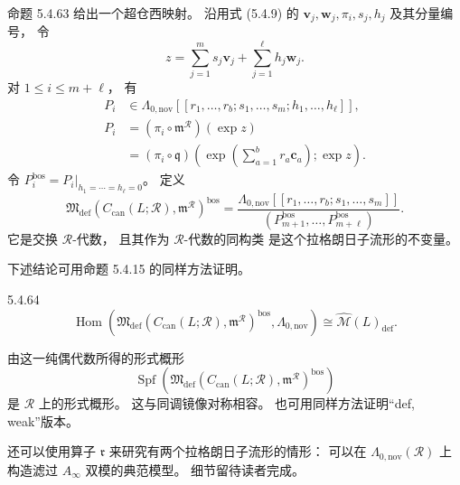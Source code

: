 命题 5.4.63 给出一个超仓西映射。
沿用式 (5.4.9) 的
$\mathbf v_j,\mathbf w_j,\pi_i,s_j,h_j$
及其分量编号，
令
\[
z=\sum_{j=1}^{m}s_j\mathbf v_j
+\sum_{j=1}^{\ell}h_j\mathbf w_j.
\]
对 $1\le i\le m+\ell$，
有
\[
\begin{aligned}
P_i&\in
\Lambda_{0,\mathrm{nov}}
[[r_1,\ldots,r_b;
s_1,\ldots,s_m;
h_1,\ldots,h_\ell]],\\
P_i
&=(\pi_i\circ\mathfrak m^{\mathcal R})(\exp z)\\
&=(\pi_i\circ\mathfrak q)
\left(
\exp\left(\sum_{a=1}^{b}r_a\mathbf c_a\right);
\exp z
\right).
\end{aligned}
\]
令
$P_i^{\mathrm{bos}}=
P_i|_{h_1=\cdots=h_\ell=0}$。
定义
\[
\mathfrak M_{\mathrm{def}}
(C_{\mathrm{can}}(L;\mathcal R),
\mathfrak m^{\mathcal R})^{\mathrm{bos}}
=
\frac{
\Lambda_{0,\mathrm{nov}}
[[r_1,\ldots,r_b;s_1,\ldots,s_m]]
}{
(P_{m+1}^{\mathrm{bos}},
\ldots,P_{m+\ell}^{\mathrm{bos}})
}.
\]
它是交换 $\mathcal R$-代数，
且其作为 $\mathcal R$-代数的同构类
是这个拉格朗日子流形的不变量。

下述结论可用命题 5.4.15
的同样方法证明。
\begin{lemma}{5.4.64}\label{lem:5-4-64}
\[
\operatorname{Hom}\left(
\mathfrak M_{\mathrm{def}}
(C_{\mathrm{can}}(L;\mathcal R),
\mathfrak m^{\mathcal R})^{\mathrm{bos}},
\Lambda_{0,\mathrm{nov}}
\right)
\cong
\widehat{\mathcal M}(L)_{\mathrm{def}}.
\]
\end{lemma}

由这一纯偶代数所得的形式概形
\[
\operatorname{Spf}\left(
\mathfrak M_{\mathrm{def}}
(C_{\mathrm{can}}(L;\mathcal R),
\mathfrak m^{\mathcal R})^{\mathrm{bos}}
\right)
\]
是 $\mathcal R$ 上的形式概形。
这与同调镜像对称相容。
也可用同样方法证明“def, weak”版本。

还可以使用算子 $\mathfrak r$
来研究有两个拉格朗日子流形的情形：
可以在
$\Lambda_{0,\mathrm{nov}}(\mathcal R)$
上构造滤过 $A_\infty$ 双模的典范模型。
细节留待读者完成。

